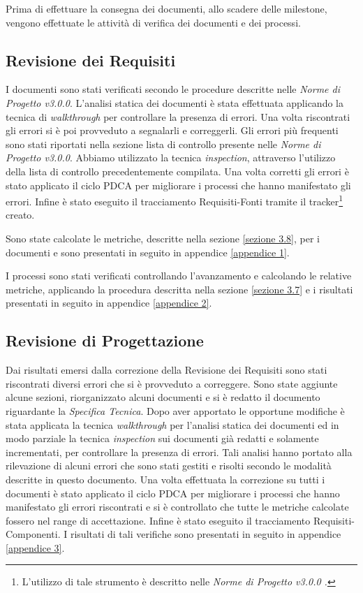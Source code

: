 Prima di effettuare la consegna dei documenti, allo scadere delle \gls{milestone}, vengono effettuate le attività di verifica dei documenti e dei processi.

\subsection{Revisione dei Requisiti}

\noindent I documenti sono stati verificati secondo le procedure descritte nelle \textit{Norme di Progetto v3.0.0}.
L'analisi statica dei documenti è stata effettuata applicando la tecnica di \textit{walkthrough} per controllare la presenza di errori. Una volta riscontrati gli errori si è poi provveduto a segnalarli e correggerli. Gli errori più frequenti sono stati riportati nella sezione lista di controllo presente nelle \textit{Norme di Progetto v3.0.0}. Abbiamo utilizzato la tecnica \textit{inspection}, attraverso l'utilizzo della lista di controllo precedentemente compilata. Una volta corretti gli errori è stato applicato il ciclo PDCA per migliorare i processi che hanno manifestato gli errori. Infine è stato eseguito il tracciamento Requisiti-Fonti tramite il tracker\footnote{L'utilizzo di tale strumento è descritto nelle \textit{Norme di Progetto v3.0.0 .}} creato. 

\noindent Sono state calcolate le metriche, descritte nella sezione \ref{sezione 3.8}, per i documenti e sono presentati in seguito in appendice \ref{appendice 1}. 

\noindent I processi sono stati verificati controllando l'avanzamento e calcolando le relative metriche, applicando la procedura descritta nella sezione \ref{sezione 3.7} e i risultati presentati in seguito in appendice \ref{appendice 2}.

\subsection{Revisione di Progettazione}

Dai risultati emersi dalla correzione della Revisione dei Requisiti sono stati riscontrati diversi errori che si è provveduto a correggere.
Sono state aggiunte alcune sezioni, riorganizzato alcuni documenti e si è redatto il documento riguardante la \textit{Specifica Tecnica}.
Dopo aver apportato le opportune modifiche è stata applicata la tecnica \textit{walkthrough} per l'analisi statica dei documenti ed in modo parziale la tecnica \textit{inspection} sui documenti già redatti e solamente incrementati, per controllare la presenza di errori. Tali analisi hanno portato alla rilevazione di alcuni errori che sono stati gestiti e risolti secondo le modalità descritte in questo documento. Una volta effettuata la correzione su tutti i documenti è stato applicato il ciclo PDCA per migliorare i processi che hanno manifestato gli errori riscontrati e si è controllato che tutte le metriche calcolate fossero nel range di accettazione. Infine è stato eseguito il tracciamento Requisiti-Componenti. I risultati di tali verifiche sono presentati in seguito in appendice \ref{appendice 3}.

